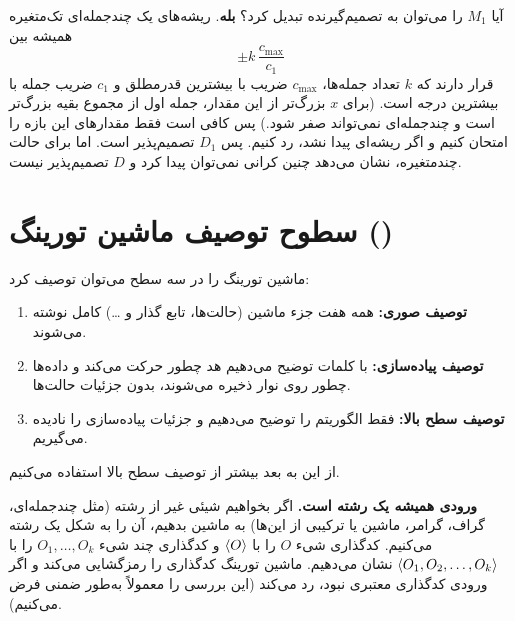 آیا $M_1$ را می‌توان به تصمیم‌گیرنده تبدیل کرد؟ \textbf{بله}. ریشه‌های یک چندجمله‌ای تک‌متغیره همیشه بین
\[\pm k\,\frac{c_{\max}}{c_1}\]
قرار دارند که $k$ تعداد جمله‌ها، $c_{\max}$ ضریب با بیشترین قدرمطلق و $c_1$ ضریب جمله با بیشترین درجه است. (برای $x$ بزرگ‌تر از این مقدار، جمله اول از مجموع بقیه بزرگ‌تر است و چندجمله‌ای نمی‌تواند صفر شود.) پس کافی است فقط مقدارهای این بازه را امتحان کنیم و اگر ریشه‌ای پیدا نشد، رد کنیم. پس $D_1$ تصمیم‌پذیر است. اما برای حالت چندمتغیره،  نشان می‌دهد چنین کرانی نمی‌توان پیدا کرد و $D$ تصمیم‌پذیر نیست.

\section{سطوح توصیف ماشین تورینگ ()}

ماشین تورینگ را در سه سطح می‌توان توصیف کرد:
\begin{enumerate}
\item \textbf{توصیف صوری:} همه هفت جزء ماشین (حالت‌ها، تابع گذار و \dots) کامل نوشته می‌شوند.
\item \textbf{توصیف پیاده‌سازی:} با کلمات توضیح می‌دهیم هد چطور حرکت می‌کند و داده‌ها چطور روی نوار ذخیره می‌شوند، بدون جزئیات حالت‌ها.
\item \textbf{توصیف سطح بالا:} فقط الگوریتم را توضیح می‌دهیم و جزئیات پیاده‌سازی را نادیده می‌گیریم.
\end{enumerate}
از این به بعد بیشتر از توصیف سطح بالا استفاده می‌کنیم.

\textbf{ورودی همیشه یک رشته است.} اگر بخواهیم شیئی غیر از رشته (مثل چندجمله‌ای، گراف، گرامر، ماشین یا ترکیبی از این‌ها) به ماشین بدهیم، آن را به شکل یک رشته  می‌کنیم. کدگذاری شیء $O$ را با $\langle O\rangle$ و کدگذاری چند شیء $O_1,\dots,O_k$ را با $\langle O_1,O_2,\dots,O_k\rangle$ نشان می‌دهیم. ماشین تورینگ کدگذاری را رمزگشایی می‌کند و اگر ورودی کدگذاری معتبری نبود، رد می‌کند (این بررسی را معمولاً به‌طور ضمنی فرض می‌کنیم).

